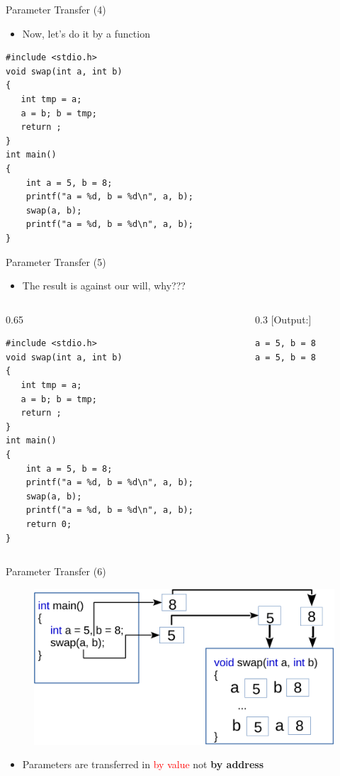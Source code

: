 \begin{frame}[fragile]{Parameter Transfer (4)}
\begin{itemize}
	\item {Now, let's do it by a function}
\end{itemize}
\begin{lstlisting}
#include <stdio.h>
void swap(int a, int b)
{
   int tmp = a;
   a = b; b = tmp;
   return ;
}
int main()
{
    int a = 5, b = 8;
    printf("a = %d, b = %d\n", a, b);
    swap(a, b);
    printf("a = %d, b = %d\n", a, b);
}
\end{lstlisting}
\end{frame}

\begin{frame}[fragile]{Parameter Transfer (5)}
\begin{itemize}
	\item {The result is against our will, why???}
\end{itemize}
\begin{columns}
\begin{column}{0.65\linewidth}
\begin{lstlisting}
#include <stdio.h>
void swap(int a, int b)
{
   int tmp = a;
   a = b; b = tmp;
   return ;
}
int main()
{
    int a = 5, b = 8;
    printf("a = %d, b = %d\n", a, b);
    swap(a, b);
    printf("a = %d, b = %d\n", a, b);
    return 0;
}
\end{lstlisting}
\end{column}
\begin{column}{0.3\linewidth}
[Output:]
\begin{lstlisting}
a = 5, b = 8
a = 5, b = 8
\end{lstlisting}
\end{column}
\end{columns}
\end{frame}

\begin{frame}[fragile]{Parameter Transfer (6)}
\begin{figure}
	\includegraphics[width=0.85\linewidth]{figs/swap.pdf}
\end{figure}
\begin{itemize}
	\item {Parameters are transferred in \textcolor{red}{by value} not \textbf{by address}}
\end{itemize}
\end{frame}

